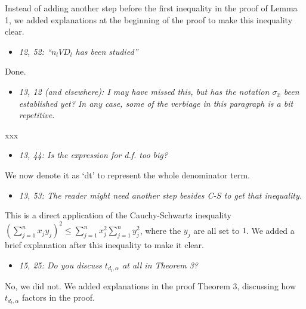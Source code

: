 \documentclass[11pt,notitlepage,onecolumn]{article}
\newcommand{\noi}{\noindent}
\begin{document}
\noi
Instead of adding another step before the first inequality in the proof of Lemma 1, we added explanations at the beginning of the proof to make this inequality clear.   
\medskip 



\begin{itemize}
\item[] \textit{12, 52: ``$n_l VD_l$ has been studied''}
\end{itemize}

\noi
Done.
\medskip 



\begin{itemize}
\item[] \textit{13, 12 (and elsewhere): I may have missed this, but has the notation $\sigma_{\hat{x}}$ been established yet? 
In any case, some of the verbiage in this paragraph is a bit repetitive.}
\end{itemize}

\noi
xxx  
\medskip 



\begin{itemize}
\item[] \textit{13, 44: Is the expression for d.f. too big?}
\end{itemize}

\noi
We now denote it as `dt' to represent the whole denominator term. 
\medskip 



\begin{itemize}
\item[] \textit{13, 53: The reader might need another step besides C-S to get that inequality.}
\end{itemize}

\noi
This is a direct application of the Cauchy-Schwartz inequality $\left(\sum_{j=1}^{n}x_j y_j\right)^2 \leq \sum_{j=1}^{n}x_j^2 \sum_{j=1}^{n}y_j^2$, where the $y_j$ are all set to $1$. 
We added a brief explanation after this inequality to make it clear. 
\medskip 



\begin{itemize}
\item[] \textit{15, 25: Do you discuss $t_{d_l,\alpha}$ at all in Theorem 3?}
\end{itemize}

\noi
No, we did not.   
We added explanations in the proof Theorem 3, discussing how $t_{d_l,\alpha}$ factors in the proof. 
\medskip 
\end{document}
